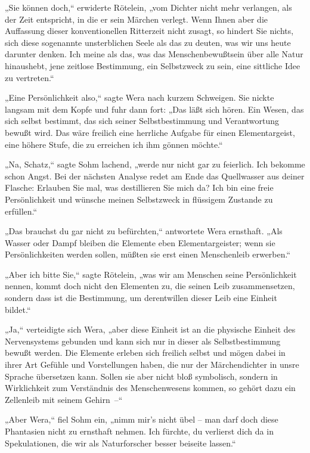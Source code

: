 „Sie können doch,“ erwiderte Rötelein, „vom Dichter nicht mehr
verlangen, als der Zeit entspricht, in die er sein Märchen verlegt.
Wenn Ihnen aber die Auffassung dieser konventionellen Ritterzeit
nicht zusagt, so hindert Sie nichts, sich diese sogenannte
unsterblichen Seele als das zu deuten, was wir uns heute darunter
denken. Ich meine als das, was das Menschenbewußtsein über alle
Natur hinaushebt, jene zeitlose Bestimmung, ein Selbstzweck zu
sein, eine sittliche Idee zu vertreten.“

„Eine Persönlichkeit also,“ sagte Wera nach kurzem Schweigen. Sie
nickte langsam mit dem Kopfe und fuhr dann fort: „Das läßt sich
hören. Ein Wesen, das sich selbst bestimmt, das sich seiner
Selbstbestimmung und Verantwortung bewußt wird. Das wäre freilich
eine herrliche Aufgabe für einen Elementargeist, eine höhere Stufe,
die zu erreichen ich ihm gönnen möchte.“

„Na, Schatz,“ sagte Sohm lachend, „werde nur nicht gar zu
feierlich. Ich bekomme schon Angst. Bei der nächsten Analyse redet
am Ende das Quellwasser aus deiner Flasche: Erlauben Sie mal, was
destillieren Sie mich da? Ich bin eine freie Persönlichkeit und
wünsche meinen Selbstzweck in flüssigem Zustande zu erfüllen.“

„Das brauchst du gar nicht zu befürchten,“ antwortete Wera
ernsthaft. „Als Wasser oder Dampf bleiben die Elemente eben
Elementargeister; wenn sie Persönlichkeiten werden sollen, müßten
sie erst einen Menschenleib erwerben.“

„Aber ich bitte Sie,“ sagte Rötelein, „was wir am Menschen seine
Persönlichkeit nennen, kommt doch nicht den Elementen zu, die
seinen Leib zusammensetzen, sondern dass ist die Bestimmung, um
derentwillen dieser Leib eine Einheit bildet.“

„Ja,“ verteidigte sich Wera, „aber diese Einheit ist an die
physische Einheit des Nervensystems gebunden und kann sich nur in
dieser als Selbstbestimmung bewußt werden. Die Elemente erleben
sich freilich selbst und mögen dabei in ihrer Art Gefühle und
Vorstellungen haben, die nur der Märchendichter in unsre Sprache
übersetzen kann. Sollen sie aber nicht bloß symbolisch, sondern in
Wirklichkeit zum Verständnis des Menschenwesens kommen, so gehört
dazu ein Zellenleib mit seinem Gehirn~–“

„Aber Wera,“ fiel Sohm ein, „nimm mir's nicht übel – man darf doch
diese Phantasien nicht zu ernsthaft nehmen. Ich fürchte, du
verlierst dich da in Spekulationen, die wir als Naturforscher
besser beiseite lassen.“

